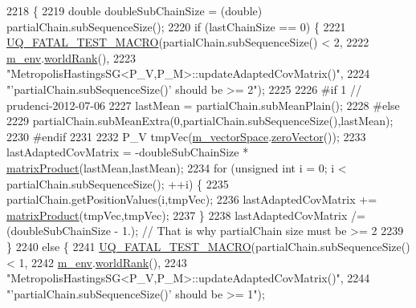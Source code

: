\begin{DoxyCode}
2218 \{
2219   \textcolor{keywordtype}{double} doubleSubChainSize = (double) partialChain.subSequenceSize();
2220   \textcolor{keywordflow}{if} (lastChainSize == 0) \{
2221     \hyperlink{_defines_8h_a56d63d18d0a6d45757de47fcc06f574d}{UQ\_FATAL\_TEST\_MACRO}(partialChain.subSequenceSize() < 2,
2222                         \hyperlink{class_q_u_e_s_o_1_1_metropolis_hastings_s_g_ac8ea061e55b920e0c8f9bce5c3f20e52}{m\_env}.\hyperlink{class_q_u_e_s_o_1_1_base_environment_a78b57112bbd0e6dd0e8afec00b40ffa7}{worldRank}(),
2223                         \textcolor{stringliteral}{"MetropolisHastingsSG<P\_V,P\_M>::updateAdaptedCovMatrix()"},
2224                         \textcolor{stringliteral}{"'partialChain.subSequenceSize()' should be >= 2"});
2225 
2226 \textcolor{preprocessor}{#if 1 // prudenci-2012-07-06}
2227 \textcolor{preprocessor}{}    lastMean = partialChain.subMeanPlain();
2228 \textcolor{preprocessor}{#else}
2229 \textcolor{preprocessor}{}    partialChain.subMeanExtra(0,partialChain.subSequenceSize(),lastMean);
2230 \textcolor{preprocessor}{#endif}
2231 \textcolor{preprocessor}{}
2232     P\_V tmpVec(\hyperlink{class_q_u_e_s_o_1_1_metropolis_hastings_s_g_a2ef17fbfc6a156f03bbfad044b5a75f5}{m\_vectorSpace}.\hyperlink{class_q_u_e_s_o_1_1_vector_space_a92e963bb5cab3eecd290dfe4b8f03b04}{zeroVector}());
2233     lastAdaptedCovMatrix = -doubleSubChainSize * \hyperlink{namespace_q_u_e_s_o_aea04e232d5d3dd76349a85bb8acf9e17}{matrixProduct}(lastMean,lastMean);
2234     \textcolor{keywordflow}{for} (\textcolor{keywordtype}{unsigned} \textcolor{keywordtype}{int} i = 0; i < partialChain.subSequenceSize(); ++i) \{
2235       partialChain.getPositionValues(i,tmpVec);
2236       lastAdaptedCovMatrix += \hyperlink{namespace_q_u_e_s_o_aea04e232d5d3dd76349a85bb8acf9e17}{matrixProduct}(tmpVec,tmpVec);
2237     \}
2238     lastAdaptedCovMatrix /= (doubleSubChainSize - 1.); \textcolor{comment}{// That is why partialChain size must be >= 2}
2239   \}
2240   \textcolor{keywordflow}{else} \{
2241     \hyperlink{_defines_8h_a56d63d18d0a6d45757de47fcc06f574d}{UQ\_FATAL\_TEST\_MACRO}(partialChain.subSequenceSize() < 1,
2242                         \hyperlink{class_q_u_e_s_o_1_1_metropolis_hastings_s_g_ac8ea061e55b920e0c8f9bce5c3f20e52}{m\_env}.\hyperlink{class_q_u_e_s_o_1_1_base_environment_a78b57112bbd0e6dd0e8afec00b40ffa7}{worldRank}(),
2243                         \textcolor{stringliteral}{"MetropolisHastingsSG<P\_V,P\_M>::updateAdaptedCovMatrix()"},
2244                         \textcolor{stringliteral}{"'partialChain.subSequenceSize()' should be >= 1"});

\end{DoxyCode}
